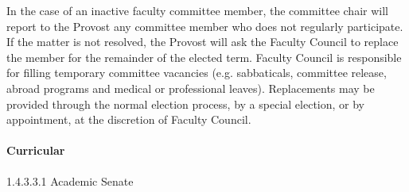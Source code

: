 \documentclass[letterpaper, 11pt]{article}
\begin{document}
				In the case of an inactive faculty committee member, the committee chair will report to the Provost any committee member who does not regularly participate.  If the matter is not resolved, the Provost will ask the Faculty Council to replace the member for the remainder of the elected term.
				Faculty Council is responsible for filling temporary committee vacancies (e.g. sabbaticals, committee release, abroad programs and medical or professional leaves).  Replacements may be provided through the normal election process, by a special election, or by appointment, at the discretion of Faculty Council.
			\paragraph{Curricular}

				1.4.3.3.1 Academic Senate
\end{document}
